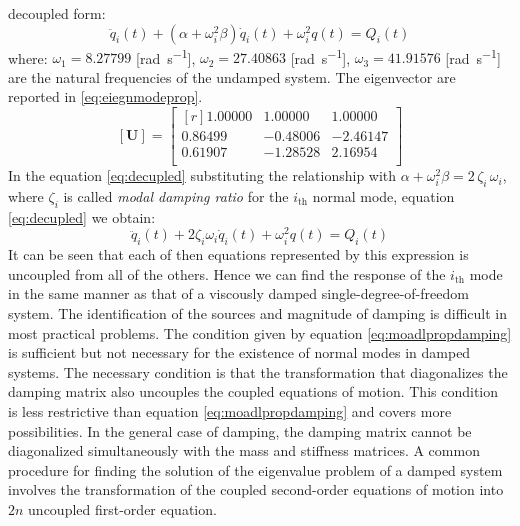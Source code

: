 decoupled form:
\begin{equation}\label{eq:decupled}
  \ddot{q}_{i}(t) + (\alpha + \omega_{i}^2\beta)\dot{q}_{i}(t) +
  \omega_{i}^{2}q(t) = Q_{i}(t)
\end{equation}
where: \(\omega_{1} = 8.27799\) [\si{\radian\per\second}],
\(\omega_{2} = 27.40863\) [\si{\radian\per\second}],
\(\omega_{3} = 41.91576\) [\si{\radian\per\second}] are
the natural frequencies of the undamped system.
The eigenvector are reported in \eqref{eq:eiegnmodeprop}.
\begin{equation}\label{eq:eiegnmodeprop}
	[\mathbf{U}] = \begin{bmatrix*}[r]
		1.00000 & 1.00000 & 1.00000 \\
		0.86499 &-0.48006 &-2.46147 \\
		0.61907 &-1.28528 & 2.16954 \\
 	\end{bmatrix*}
\end{equation}
In the equation \eqref{eq:decupled} substituting the relationship with 
\(\alpha + \omega^{2}_{i}\beta = 2\,\zeta_{i}\,\omega_{i}\), where
\(\zeta_{i}\) is called \emph{modal damping ratio} for the \(i_\text{th}\) normal
mode, equation \eqref{eq:decupled} we obtain:
\begin{equation}\label{eq:decupled2}
  \ddot{q}_{i}(t) + 2\zeta_{i}\omega_{i}\dot{q}_{i}(t) +
  \omega_{i}^{2}q(t) = Q_{i}(t)
\end{equation}
It can be seen that each of then equations represented by this expression is
uncoupled from all of the others.
Hence we can find the response of the \(i_\text{th}\) mode in the same manner
as that of a viscously damped single-degree-of-freedom system.
%
The identification of the sources and magnitude of damping is difficult in most
practical problems.
The condition given by equation \eqref{eq:moadlpropdamping} is sufficient but not
necessary for the existence of normal modes in damped systems.
The necessary condition is that the transformation that diagonalizes the damping
matrix also uncouples the coupled equations of motion.
This condition is less restrictive than equation \eqref{eq:moadlpropdamping}
and covers more possibilities.
In the general case of damping, the damping matrix cannot be diagonalized
simultaneously with the mass and stiffness matrices.
A common procedure for finding the solution of the eigenvalue problem of a
damped system involves the transformation of the coupled second-order
equations of motion into \(2n\) uncoupled first-order equation.
%


